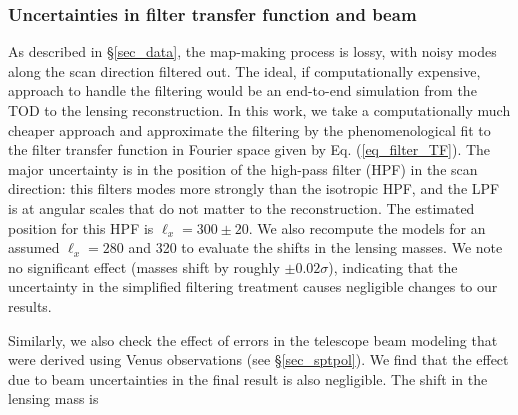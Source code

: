\subsubsection{Uncertainties in filter transfer function and beam}\label{subsec_TF}
As described in \S\ref{sec_data}, the \sptpol{} map-making process is lossy, with noisy modes along the scan direction filtered out. 
The ideal, if computationally expensive, approach to handle the filtering would be an end-to-end simulation from the TOD to the lensing reconstruction. 
In this work, we take a computationally much cheaper approach and approximate the filtering by the phenomenological fit to the filter transfer function in Fourier space given by Eq. (\ref{eq_filter_TF}). 
The major uncertainty is in the position of the high-pass filter (HPF) in the scan direction: this filters modes more strongly than the isotropic HPF, and the LPF is at angular scales that do not matter to the reconstruction. 
The estimated position for this HPF is $\ell_x = 300 \pm 20$. 
We also recompute the models for an assumed $\ell_x = 280$ and 320 to evaluate the shifts in the lensing masses.
We note no significant effect (masses shift by roughly $\pm 0.02\sigma$), indicating that the uncertainty in the simplified filtering treatment causes negligible changes to our results.

Similarly, we also check the effect of errors in the telescope beam modeling \beambl{} that were derived using Venus observations (see \S\ref{sec_sptpol}). 
We find that the effect due to beam uncertainties in the final result is also negligible. 
The shift in the lensing mass is%
